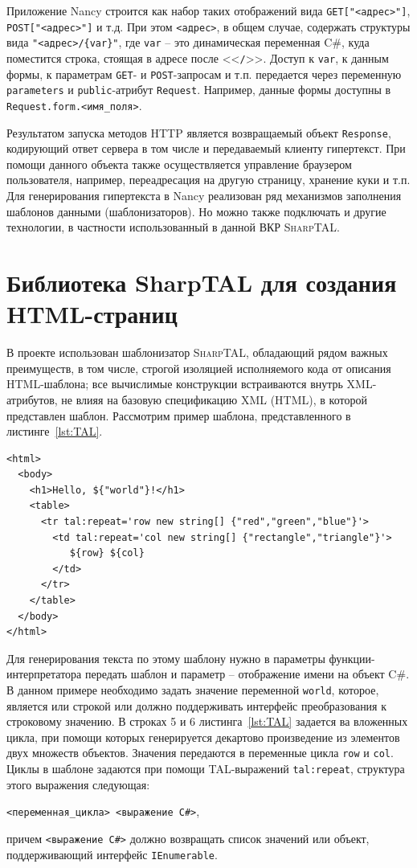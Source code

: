 \documentclass[a4paper,14pt,openany,final]{extreport} %
\def\oldcaption{} \let\oldcaption=\caption
\def\caption{\stepcounter{captionsnum}\oldcaption}
\begin{document}
Приложение Nancy строится как набор таких отображений вида \verb|GET["<адрес>"]|, \verb|POST["<адрес>"]| и т.д. При этом \verb|<адрес>|, в общем случае, содержать структуры вида \verb|"<адрес>/{var}"|, где \verb|var| -- это динамическая переменная C\#, куда поместится строка, стоящая в адресе после <<\verb|/|>>. Доступ к \verb|var|, к данным формы, к параметрам \verb|GET|- и \verb|POST|-запросам и т.п. передается через переменную \verb|parameters| и \verb|public|-атрибут \verb|Request|. Например, данные формы доступны в \verb|Request.form.<имя_поля>|.

Результатом запуска методов HTTP является возвращаемый объект \verb|Response|, кодирующий ответ сервера в том числе и передаваемый клиенту гипертекст. При помощи данного объекта также осуществляется управление браузером пользователя, например, переадресация на другую страницу, хранение куки и т.п.  Для генерирования гипертекста в Nancy реализован ряд механизмов заполнения шаблонов данными (шаблонизаторов). Но можно также подключать и другие технологии, в частности использованный в данной ВКР \textsc{SharpTAL}.


\section{Библиотека SharpTAL для создания HTML-страниц}
В проекте использован шаблонизатор \textsc{SharpTAL}, обладающий рядом важных преимуществ, в том числе, строгой изоляцией исполняемого кода от описания HTML-шаблона; все вычислимые конструкции встраиваются внутрь XML-атрибутов, не влияя на базовую спецификацию XML (HTML), в которой представлен шаблон.  Рассмотрим пример шаблона, представленного в листинге~\ref{lst:TAL}.

\begin{pzlisting}
  \caption{Шаблон \textsc{SharpTAL} (пример)}\label{lst:TAL}
\begin{verbatim}
<html>
  <body>
    <h1>Hello, ${"world"}!</h1>
    <table>
      <tr tal:repeat='row new string[] {"red","green","blue"}'>
        <td tal:repeat='col new string[] {"rectangle","triangle"}'>
           ${row} ${col}
        </td>
      </tr>
    </table>
  </body>
</html>
\end{verbatim}
\end{pzlisting}

Для генерирования текста по этому шаблону нужно в параметры функции-интерпретатора передать шаблон и параметр -- отображение имени на объект C\#.  В данном примере необходимо задать значение переменной \verb|world|, которое, является или строкой или должно поддерживать интерфейс преобразования к строковому значению.  В строках 5 и 6 листинга~\ref{lst:TAL} задается ва вложенных цикла, при помощи которых генерируется декартово произведение из элементов двух множеств объектов. Значения передаются в переменные цикла \verb|row| и \verb|col|.  Циклы в шаблоне задаются при помощи TAL-выражений \verb|tal:repeat|, структура этого выражения следующая:
\begin{center}
\verb|<переменная_цикла> <выражение C#>|,
\end{center}
причем \verb|<выражение С#>| должно возвращать список значений или объект, поддерживающий интерфейс \verb|IEnumerable|.
\end{document}
